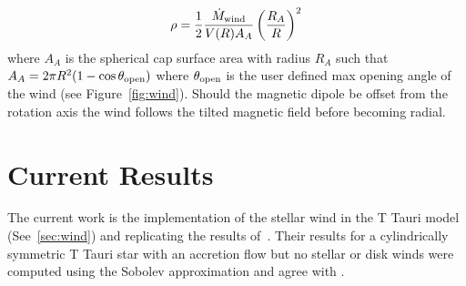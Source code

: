 \documentclass[fleqn,usenatbib]{mnras}
\begin{document}
\begin{equation}
    \rho = \frac{1}{2}\frac{\dot{M}_{\rm wind}}{V(R)A_{A}}\left( \frac{R_{A}}{R}\right)^2
\end{equation}
where $A_A$ is the spherical cap surface area with radius $R_A$ such that $A_A = 2\pi R^2 (1-\cos\theta_{\rm open})$ where $\theta_{\rm open}$ is the user defined max opening angle of the wind (see Figure~\ref{fig:wind}). Should the magnetic dipole be offset from the rotation axis the wind follows the tilted magnetic field before becoming radial.

\section{Current Results}
\label{sec:results}

The current work is the implementation of the stellar wind in the T Tauri model (See~\ref{sec:wind}) and replicating the results of~\citet{1998ApJ...492..743M}. Their results for a cylindrically symmetric T Tauri star with an accretion flow but no stellar or disk winds were computed using the Sobolev approximation and agree with \citet{Hartmann:1994tl}.
\end{document}
